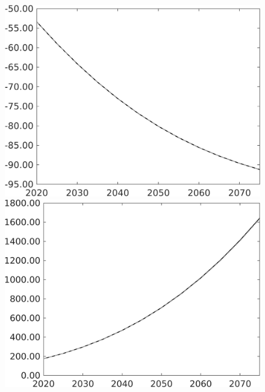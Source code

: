 \documentclass[12pt]{article}
\begin{document}
\begin{figure}[h!!]
\begin{minipage}[]{0.32\textwidth}
	\end{minipage}	
	\begin{minipage}[]{0.32\textwidth}
		\includegraphics[width=1\textwidth]{../../codding_model/own_basedOnFried/optimalPol_010922_revision/figures/all_13Sept22/PerdifNoTauf_Equlab_regime0_CompTaul_F_spillover0_nsk0_xgr0_knspil1_sep1_LFlimit0_emsbase0_countec0_GovRev0_etaa0.79_lgd0.png}
	\end{minipage}	
	\begin{minipage}[]{0.32\textwidth}
		\includegraphics[width=1\textwidth]{../../codding_model/own_basedOnFried/optimalPol_010922_revision/figures/all_13Sept22/PerdifNoTauf_Equlab_regime0_CompTaul_G_spillover0_nsk0_xgr0_knspil1_sep1_LFlimit0_emsbase0_countec0_GovRev0_etaa0.79_lgd0.png}

\end{minipage}
\end{figure}
\end{document}

